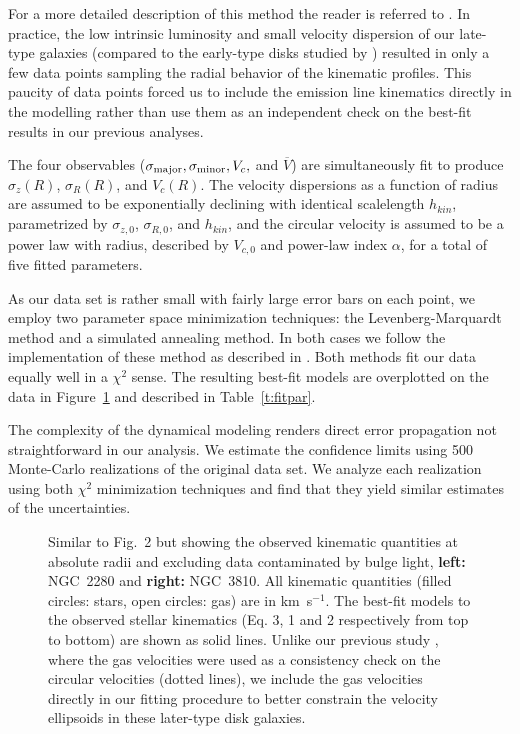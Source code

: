 \documentclass[useAMS,usenatbib]{mn2e}
\newcommand{\kms}{km~s$^{-1}$}
\newcommand{\sz}{$\sigma_z$}
\newcommand{\sr}{$\sigma_R$}
\begin{document}
For a more detailed description of this method the reader is
referred to \citet{Shapiro2003}.
%
In practice, the low intrinsic luminosity and small velocity dispersion
of our late-type galaxies (compared to the early-type disks studied by
\citealt{Gerssen1997, Gerssen2000, Shapiro2003}) resulted in only a few
data points sampling the radial behavior of the kinematic profiles.
This paucity of data points forced us to include the emission line
kinematics directly in the modelling rather than use them as an
independent check on the best-fit results in our previous analyses.

The four observables ($\sigma_{\rm major}, \sigma_{\rm minor}, V_c,$
and $\overline{V}$) are simultaneously fit to produce \sz$(R)$,
\sr$(R)$, and $V_c(R)$.  The velocity dispersions as a
function of radius are assumed to be exponentially declining with
identical scalelength $h_{kin}$, parametrized by $\sigma_{z,0}$,
$\sigma_{R,0}$, and $h_{kin}$, and the circular velocity is assumed to
be a power law with radius, described by $V_{c,0}$ and power-law index
$\alpha$, for a total of five fitted parameters.

As our data set is rather small with fairly large error bars on each
point, we employ two parameter space minimization techniques: the
Levenberg-Marquardt method and a simulated annealing method.  In both
cases we follow the implementation of these method as described in
\citet{Press1992}. Both methods fit our data equally well in a
$\chi^2$ sense.  The resulting best-fit models are overplotted on the
data in Figure~\ref{f:bestfit} and described in Table~\ref{t:fitpar}.

The complexity of the dynamical modeling renders direct error
propagation not straightforward in our analysis.  We estimate the
confidence limits using 500 Monte-Carlo realizations of the original
data set.  We analyze each realization using both $\chi^2$ minimization
techniques and find that they yield similar estimates of the
uncertainties.



\begin{figure}
   \centerline{}
   \caption{Similar to Fig.~2 but showing the observed kinematic
     quantities at absolute radii and excluding data contaminated by
     bulge light, {\bf left:} NGC~2280 and {\bf right:} NGC~3810.  All
     kinematic quantities (filled circles: stars, open circles: gas) are
     in \kms.  The best-fit models to the observed stellar kinematics
     (Eq. 3, 1 and 2 respectively from top to bottom) are shown as solid
     lines.  Unlike our previous study \citep{Shapiro2003}, where the
     gas velocities were used as a consistency check on the circular
     velocities (dotted lines), we include the gas velocities directly
     in our fitting procedure to better constrain the velocity
     ellipsoids in these later-type disk galaxies.
   \label{f:bestfit}}
\end{figure}
\end{document}
